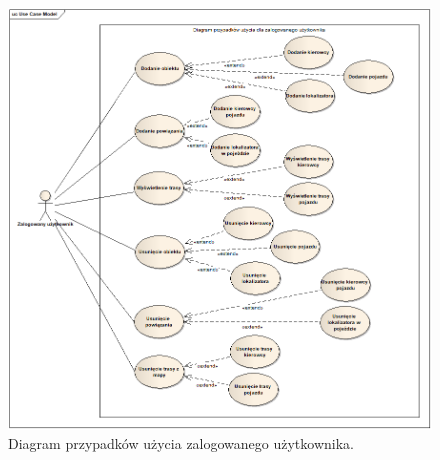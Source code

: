 \begin{figure}
\centering
\includegraphics[width=1\textwidth]{./graf/Przypadki_uzycia_zalogowany.png}
\caption{Diagram przypadków użycia zalogowanego użytkownika.}
\label{fig:2}
\end{figure}


